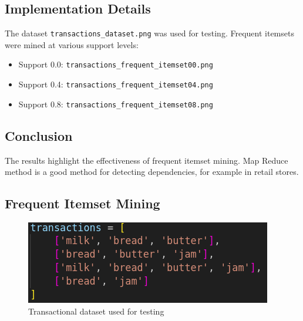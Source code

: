 \documentclass{article}
\begin{document}
\subsection{Implementation Details}
The dataset \texttt{transactions\_dataset.png} was used for testing. Frequent itemsets were mined at various support levels:
\begin{itemize}
    \item Support 0.0: \texttt{transactions\_frequent\_itemset00.png}
    \item Support 0.4: \texttt{transactions\_frequent\_itemset04.png}
    \item Support 0.8: \texttt{transactions\_frequent\_itemset08.png}
\end{itemize}

\subsection{Conclusion}
The results highlight the effectiveness of frequent itemset mining. Map Reduce method is a good method for detecting dependencies, for example in retail stores.

\subsection{Frequent Itemset Mining}
\begin{figure}[H]
    \centering
    \includegraphics[width=\textwidth]{transactions_dataset.png}
    \caption{Transactional dataset used for testing}
\end{figure}
\end{document}
